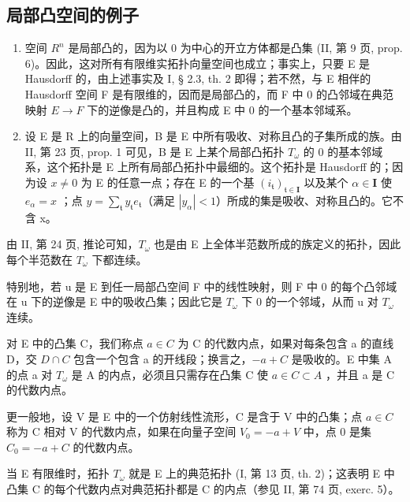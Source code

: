 \subsection{局部凸空间的例子}

\begin{enumerate}
\def\labelenumi{\arabic{enumi})}
\item
  空间 \(R^{n}\) 是局部凸的，因为以 0 为中心的开立方体都是凸集 (II, 第 9 页, prop. 6)。因此，这对所有有限维实拓扑向量空间也成立；事实上，只要 E 是 Hausdorff 的，由上述事实及 I, § 2.3, th. 2 即得；若不然，与 E 相伴的 Hausdorff 空间 F 是有限维的，因而是局部凸的，而 F 中 0 的凸邻域在典范映射 \(E \rightarrow F\) 下的逆像是凸的，并且构成 E 中 0 的一个基本邻域系。
\item
  设 E 是 R 上的向量空间，B 是 E 中所有吸收、对称且凸的子集所成的族。由 II, 第 23 页, prop. 1 可见，B 是 E 上某个局部凸拓扑 \(T_{\omega}\) 的 0 的基本邻域系，这个拓扑是 E 上所有局部凸拓扑中最细的。这个拓扑是 Hausdorff 的；因为设 \(x \neq 0\) 为 E 的任意一点；存在 E 的一个基 \((i_{\mathfrak{t}})_{\mathfrak{t} \in \mathbf{I}}\) 以及某个 \(\alpha \in \mathbf{I}\) 使 \(e_{\alpha} = x\) ；点 \(y = \sum_{\mathfrak{t}} y_{\mathfrak{t}} e_{\mathfrak{t}}\)（满足 \(|y_{\alpha}| < 1\)）所成的集是吸收、对称且凸的。它不含 x。
\end{enumerate}

由 II, 第 24 页, 推论可知，\(T_{\omega}\) 也是由 E 上全体半范数所成的族定义的拓扑，因此每个半范数在 \(T_{\omega}\) 下都连续。

特别地，若 u 是 E 到任一局部凸空间 F 中的线性映射，则 F 中 0 的每个凸邻域在 u 下的逆像是 E 中的吸收凸集；因此它是 \(T_{\omega}\) 下 0 的一个邻域，从而 u 对 \(T_{\omega}\) 连续。

对 E 中的凸集 C，我们称点 \(a \in C\) 为 C 的代数内点，如果对每条包含 a 的直线 D，交 \(D \cap C\) 包含一个包含 a 的开线段；换言之，\(-a + C\) 是吸收的。E 中集 A 的点 a 对 \(T_{\omega}\) 是 A 的内点，必须且只需存在凸集 C 使 \(a \in C \subset A\) ，并且 a 是 C 的代数内点。

更一般地，设 V 是 E 中的一个仿射线性流形，C 是含于 V 中的凸集；点 \(a \in C\) 称为 C 相对 V 的代数内点，如果在向量子空间 \(V_{0} = -a + V\) 中，点 0 是集 \(C_{0} = -a + C\) 的代数内点。

当 E 有限维时，拓扑 \(T_{\omega}\) 就是 E 上的典范拓扑 (I, 第 13 页, th. 2)；这表明 E 中凸集 C 的每个代数内点对典范拓扑都是 C 的内点（参见 II, 第 74 页, exerc. 5）。


